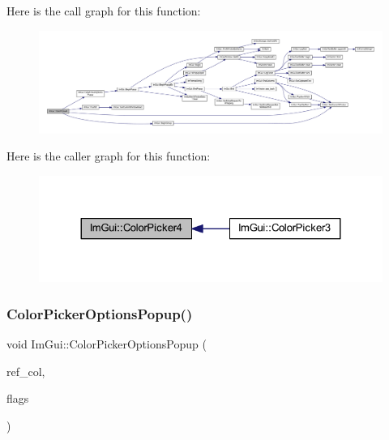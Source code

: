 Here is the call graph for this function\+:
\nopagebreak
\begin{figure}[H]
\begin{center}
\leavevmode
\includegraphics[width=350pt]{namespace_im_gui_a3d5aae9e0a14aa051d5a799abbe97b32_cgraph}
\end{center}
\end{figure}
Here is the caller graph for this function\+:
\nopagebreak
\begin{figure}[H]
\begin{center}
\leavevmode
\includegraphics[width=324pt]{namespace_im_gui_a3d5aae9e0a14aa051d5a799abbe97b32_icgraph}
\end{center}
\end{figure}
\mbox{\label{namespace_im_gui_a6d112eeb6d8ffdebbc9d9a8c66babbee}} 
\subsubsection{\texorpdfstring{Color\+Picker\+Options\+Popup()}{ColorPickerOptionsPopup()}}
{\footnotesize\ttfamily void Im\+Gui\+::\+Color\+Picker\+Options\+Popup (\begin{DoxyParamCaption}\item[{const float $\ast$}]{ref\+\_\+col,  }\item[{\mbox{\hyperlink{imgui_8h_a6b2d5e95adc38f22c021252189f669c6}{Im\+Gui\+Color\+Edit\+Flags}}}]{flags }\end{DoxyParamCaption})}

